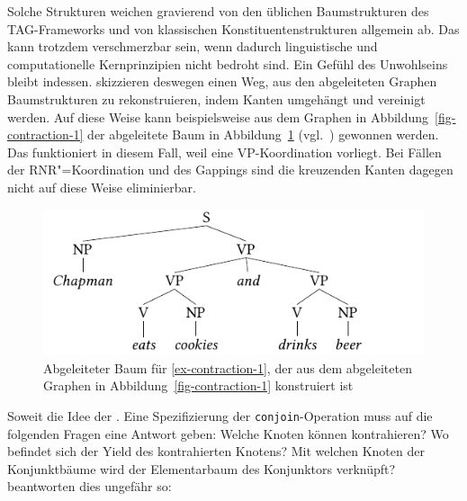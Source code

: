 Solche Strukturen weichen gravierend von den üblichen Baumstrukturen des TAG-Frameworks und von klassischen Konstituentenstrukturen allgemein ab. Das kann trotzdem verschmerzbar sein, wenn dadurch linguistische und computationelle Kernprinzipien nicht bedroht sind. Ein Gefühl des Unwohlseins bleibt indessen. \cite{Sarkar:Joshi:97} skizzieren deswegen einen Weg, aus den abgeleiteten Graphen Baumstrukturen zu rekonstruieren, indem Kanten umgehängt und vereinigt werden. Auf diese Weise kann beispielsweise aus dem Graphen in Abbildung~\ref{fig-contraction-1} der abgeleitete Baum in Abbildung~\ref{fig-kontraktion-baumisierung} (vgl.\ \citealt[Figure~16]{Sarkar:Joshi:97}) gewonnen werden. Das funktioniert in diesem Fall, weil eine VP-Koordination vorliegt. Bei Fällen der RNR"=Koordination und des Gappings sind die kreuzenden Kanten dagegen nicht auf diese Weise eliminierbar. 

\begin{figure}[t]
\centering
\includegraphics{graphics/abb87.pdf}
\caption{\label{fig-kontraktion-baumisierung}Abgeleiteter Baum für \ref{ex-contraction-1}, der aus dem abgeleiteten Graphen in Abbildung~\ref{fig-contraction-1} konstruiert ist}
\end{figure}

Soweit die Idee der . Eine Spezifizierung der {\tt conjoin}-Operation muss auf die folgenden Fragen eine Antwort geben: Welche Knoten können kontrahieren? Wo befindet sich der Yield des kontrahierten Knotens? Mit welchen Knoten der Konjunktbäume wird der Elementarbaum des Konjunktors verknüpft? \cite{Sarkar:Joshi:96,Sarkar:Joshi:97} beantworten dies ungefähr so: 

